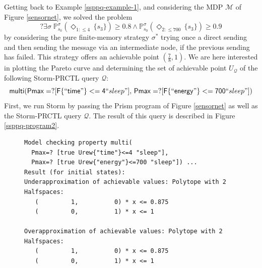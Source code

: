 \begin{example}
Getting back to Example \ref{ssppq-example-1}, and considering the MDP $\mathcal{M}$ of Figure \ref{sensornet}, we solved the \SSPPQ{} problem
\[
  ?\exists \sigma \;
  \mathbb{P}_{s_0}^\sigma(\Diamond_{1:\leq 4} \,
  \{s_3\}) \geq 0.8 \wedge
  \mathbb{P}_{s_0}^\sigma(\Diamond_{2:\leq 700} \,
  \{s_3\}) \geq 0.9
\]
by considering the pure finite-memory strategy $\sigma^*$ trying once a direct sending and then sending the message via an intermediate node, if the previous sending has failed.
This strategy offers an achievable point $(\frac{7}{8}, 1)$.
We are here interested in plotting the Pareto curve and determining the set of achievable point $U_\mathcal{Q}$ of the following Storm-PRCTL query $\mathcal{Q}$:
\[\mathsf{multi(Pmax = ? [F\{``time"\}<=4}``sleep"\mathsf{], \, Pmax=?[F\{``energy"\}<=700}``sleep"\mathsf{])}
\]
First, we run Storm by passing the Prism program of Figure \ref{sensornet} as well as the Storm-PRCTL query $\mathcal{Q}$.
The result of this query is described in Figure \ref{ssppq-program2}.
\begin{figure}[h!]
  {
  \footnotesize
  \begin{verbatim}
Model checking property multi(
  Pmax=? [true Urew{"time"}<=4 "sleep"],
  Pmax=? [true Urew{"energy"}<=700 "sleep"]) ...
Result (for initial states):
Underapproximation of achievable values: Polytope with 2 Halfspaces:
   (         1,          0) * x <= 0.875
   (         0,          1) * x <= 1

Overapproximation of achievable values: Polytope with 2 Halfspaces:
   (         1,          0) * x <= 0.875
   (         0,          1) * x <= 1


\end{verbatim}}
\end{figure}
\end{example}
